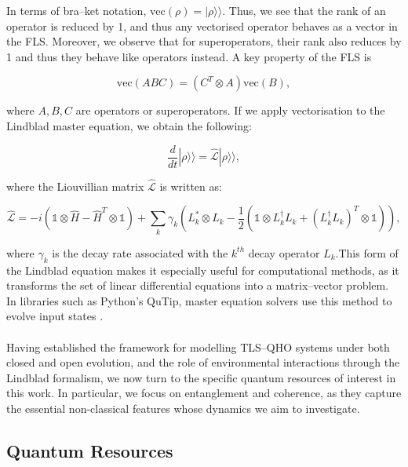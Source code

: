 \documentclass[11pt]{article}
\begin{document}
In terms of bra--ket notation, $\text{vec}(\rho) = |\rho \rangle\rangle.$ Thus, we see that the rank of an operator is reduced by 1, and thus any vectorised operator behaves as a vector in the FLS. Moreover, we observe that for superoperators, their rank also reduces by 1 and thus they behave like operators instead. A key property of the FLS is

\begin{equation*}
    \text{vec}(ABC) = (C^T \otimes A)\text{vec}(B),
\end{equation*}

where $A,B,C$ are operators or superoperators. If we apply vectorisation to the Lindblad master equation, we obtain the following:

\begin{equation}
    \frac{d}{dt}|\rho\rangle\rangle = \hat{\mathcal{L}}|\rho\rangle\rangle,
\end{equation}

where the Liouvillian matrix $\hat{\mathcal{L}}$ is written as:

\begin{equation}
    \hat{\mathcal{L}} = -i\left( \mathds{1} \otimes \hat{H} - \hat{H}^T \otimes \mathds{1}  \right) + \sum_k \gamma_k\left(L_k^*\otimes L_k - \frac{1}{2}\left(\mathds{1} \otimes L_k^\dagger L_k + (L_k^\dagger L_k)^T\otimes \mathds{1} \right) \right),
\end{equation}

where $\gamma_k$ is the decay rate associated with the $k^{th}$ decay operator $L_k$.This form of the Lindblad equation makes it especially useful for computational methods, as it transforms the set of linear differential equations into a matrix--vector problem. In libraries such as Python's QuTip, master equation solvers use this method to evolve input states \cite{Comp2012-Qutip}.\\
\\
Having established the framework for modelling TLS--QHO systems under both closed and open evolution, and the role of environmental interactions through the Lindblad formalism, we now turn to the specific quantum resources of interest in this work. In particular, we focus on entanglement and coherence, as they capture the essential non-classical features whose dynamics we aim to investigate.
\subsection{Quantum Resources} \label{sec:theory_sub_ent}
\end{document}
